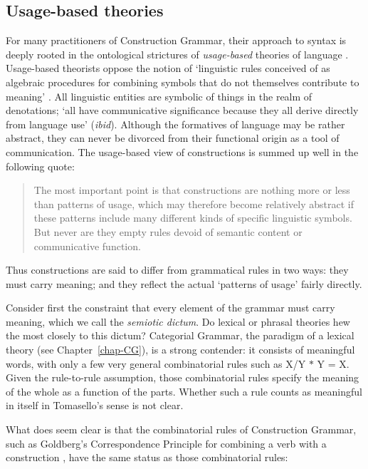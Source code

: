 \subsection{Usage-based theories}\label{usage-based-sec}

For many practitioners of Construction Grammar, their approach to syntax is deeply rooted in the
ontological strictures of \emph{usage-based} theories of language \citep{Langacker87a-u, Goldberg95a,
Croft2001a, Tomasello2003a}.  Usage-based theorists oppose the notion of `linguistic rules conceived
of as algebraic procedures for combining symbols that do not themselves contribute to meaning'
\citep[]{Tomasello2003a}. All linguistic entities are symbolic of things in the realm of denotations;
`all have communicative significance because they all derive directly from language use' (\emph{ibid}). Although the formatives of language may be rather abstract, they can never be divorced
from their functional origin as a tool of communication.  The usage-based view of constructions is
summed up well in the following quote:
\begin{quote}
The most important point is that constructions are nothing more or less than patterns of usage,
which may therefore become relatively abstract if these patterns include many different kinds of
specific linguistic symbols.  But never are they empty rules devoid of semantic content or
communicative function. \citep[]{Tomasello2003a}
\end{quote}

\noindent 
Thus constructions are said to differ from grammatical rules in two ways: they must carry meaning;
and they reflect the actual `patterns of usage' fairly directly.

Consider first the constraint that every element of the grammar must carry meaning, which we call
the \emph{semiotic dictum}.  Do lexical or phrasal theories hew the most closely to this dictum?
Categorial Grammar, the paradigm of a lexical theory (see Chapter~\ref{chap-CG}), is a strong
contender: it consists of meaningful words, with only a few very general combinatorial rules such as
X/Y $*$ Y = X.  Given the rule-to-rule assumption, those combinatorial rules specify the meaning of the
whole as a function of the parts.  Whether such a rule counts as meaningful in itself in Tomasello's
sense is not clear.

What does seem clear is that the combinatorial rules of Construction Grammar, such as Goldberg's
Correspondence Principle for combining a verb with a construction \citeyearpar[]{Goldberg95a},
have the same status as those combinatorial rules:

